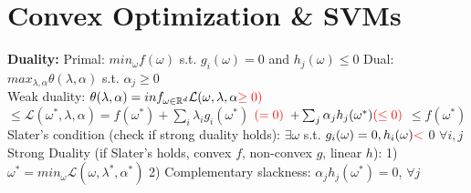 \section{Convex Optimization \& SVMs}
\textbf{Duality: } Primal: $min_{\omega} f(\omega)$ s.t. $g_{i}(\omega) = 0$ and $h_{j}(\omega) \leq 0$
Dual: $max_{\lambda, \alpha}\theta(\lambda, \alpha)$ s.t. $\alpha_{j} \geq 0$
\\
Weak duality: $\theta(\lambda, \alpha) = inf_{\omega \in \mathbb{R}^{d}} \mathcal{L}(\omega, \lambda, \alpha \color{red}{\geq 0)}$ $\leq \mathcal{L}(\omega^{*}, \lambda, \alpha) = f(\omega^{*}) + \sum_{i}\lambda_{i}g_{i}(\omega^{*})$ $\color{red}{(= 0)}$ $+ \sum_{j}\alpha_{j}h_{j}(\omega^{*}) \color{red}{(\leq 0)}$ $\leq f(\omega^{*})$
\\
Slater's condition (check if strong duality holds): 
$\exists \omega$ s.t. $g_i(\omega) = 0, h_i({\omega}) \color{red}{<}$ $0$ $\forall i, j$ \\
Strong Duality (if Slater's holds, convex $f$, non-convex $g$, linear $h$):
1) $\omega^{*} = min_{\omega} \mathcal{L}(\omega, \lambda^{*}, \alpha^{*})$
2) Complementary slackness: $\alpha_{j}h_{j}(\omega^{*}) = 0$, $\forall j$

